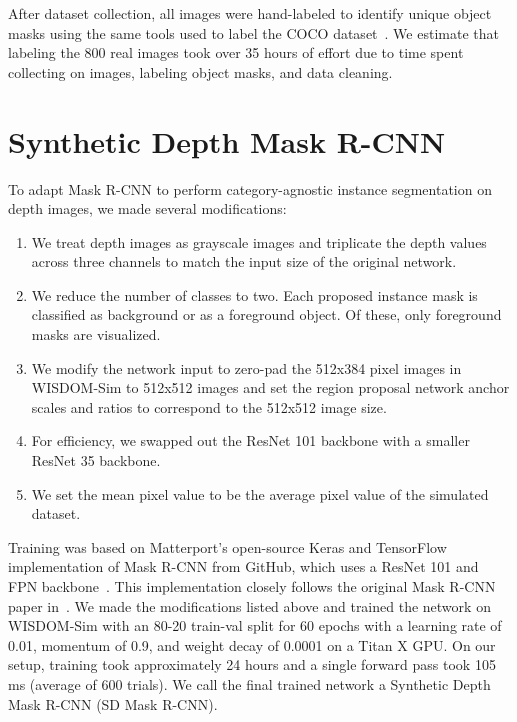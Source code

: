 \documentclass[letterpaper, 10 pt, conference]{ieeeconf}  \pdfoutput=1
\numberwithin{equation}{section}
\begin{document}
After dataset collection, all images were hand-labeled to identify unique object masks using the same tools used to label the COCO dataset~\cite{lin2014microsoft}.
We estimate that labeling the 800 real images took over 35 hours of effort due to time spent collecting on images, labeling object masks, and data cleaning.
 \section{Synthetic Depth Mask R-CNN}
To adapt Mask R-CNN to perform category-agnostic instance segmentation on depth images, we made several modifications:
\begin{enumerate}
\item We treat depth images as grayscale images and triplicate the depth values across three channels to match the input size of the original network.
\item We reduce the number of classes to two. Each proposed instance mask is classified as background or as a foreground object. Of these, only foreground masks are visualized.
\item We modify the network input to zero-pad the 512x384 pixel images in WISDOM-Sim to 512x512 images and set the region proposal network anchor scales and ratios to correspond to the 512x512 image size. 
\item For efficiency, we swapped out the ResNet 101 backbone with a smaller ResNet 35 backbone.
\item We set the mean pixel value to be the average pixel value of the simulated dataset.
\end{enumerate}

Training was based on Matterport's open-source Keras and TensorFlow implementation of Mask R-CNN from GitHub, which uses a ResNet 101 and FPN backbone~\cite{matterport2017mask}. This implementation closely follows the original Mask R-CNN paper in~\cite{he2017mask}. We made the modifications listed above and trained the network on WISDOM-Sim with an 80-20 train-val split for 60 epochs with a learning rate of 0.01, momentum of 0.9, and weight decay of 0.0001 on a Titan X GPU. On our setup, training took approximately 24 hours and a single forward pass took 105 ms (average of 600 trials). We call the final trained network a Synthetic Depth Mask R-CNN (SD Mask R-CNN).
\end{document}
